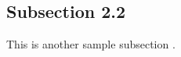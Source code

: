 \subsection{Subsection 2.2}
\label{sec:subsection2.2}

This is another sample subsection \cite[Section 2.3]{inception-resnet}.



